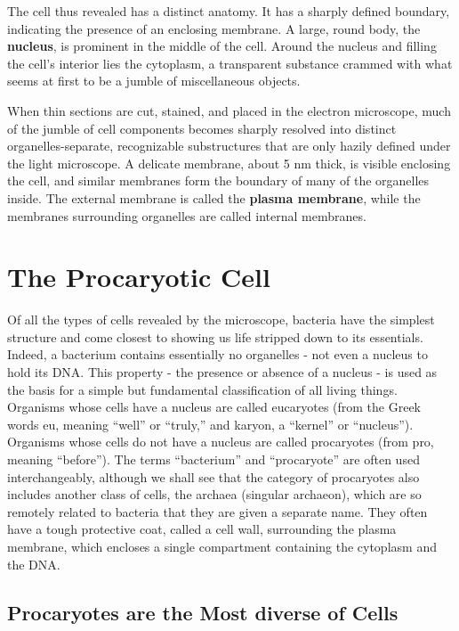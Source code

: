 The cell thus revealed has a distinct anatomy. It has a sharply
defined boundary, indicating the presence of an enclosing membrane.
A large, round body, the \textbf{nucleus}, is prominent in the middle of the cell.
Around the nucleus and filling the cell’s interior lies the cytoplasm, a
transparent substance crammed with what seems at first to be a jumble
of miscellaneous objects.

When thin sections are cut, stained, and placed in the electron microscope,
much of the jumble of cell components becomes sharply resolved
into distinct organelles-separate, recognizable substructures that are
only hazily defined under the light microscope. A delicate membrane,
about 5 nm thick, is visible enclosing the cell, and similar membranes
form the boundary of many of the organelles inside. The
external membrane is called the \textbf{plasma membrane}, while the membranes
surrounding organelles are called internal membranes.

\section{The Procaryotic Cell}

Of all the types of cells revealed by the microscope, bacteria have the
simplest structure and come closest to showing us life stripped down to
its essentials. Indeed, a bacterium contains essentially no organelles - not
even a nucleus to hold its DNA. This property - the presence or absence of
a nucleus - is used as the basis for a simple but fundamental classification
of all living things. Organisms whose cells have a nucleus are called
eucaryotes (from the Greek words eu, meaning “well” or “truly,” and
karyon, a “kernel” or “nucleus”). Organisms whose cells do not have a
nucleus are called procaryotes (from pro, meaning “before”). The terms
“bacterium” and “procaryote” are often used interchangeably, although
we shall see that the category of procaryotes also includes another class
of cells, the archaea (singular archaeon), which are so remotely related to
bacteria that they are given a separate name.
They often have a tough protective coat, called a cell wall, surrounding the plasma
membrane, which encloses a single compartment containing the cytoplasm and the DNA.

\subsection{Procaryotes are the Most diverse of Cells}

